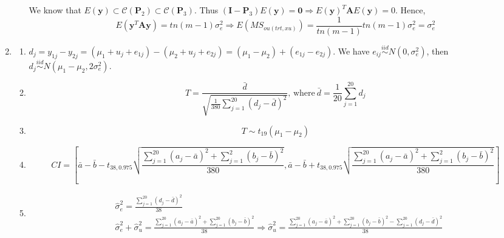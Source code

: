 \documentclass{article}
\begin{document}
\begin{enumerate}[leftmargin = 0 em, label = \arabic*., font = \bfseries]
\begin{enumerate}
	      	 We know that $E(\bm y) \subset \mathcal{C}(\bm P_{2}) \subset \mathcal{C}(\bm P_{3})$. Thus $(\bm I - \bm P_{3}) E(\bm y) = \bm 0 \Rightarrow E(\bm y)^T \bm A E(\bm y) = 0$.
	      	 Hence,
	      	 \[E (\bm y^T \bm A \bm y) = tn(m-1) \sigma_e^2 \Rightarrow E(MS_{ou(trt, xu)}) = \frac{1}{tn(m-1)} tn (m-1) \sigma_e^2 = \sigma_e^2\]
	      	 


			  \end{enumerate}

			  \item 
			  \begin{enumerate}
			  	\item 
			  	$d_j = y_{1j} - y_{2j} = (\mu_1 + u _j + e_{1j}) - (\mu_2 + u_j + e_{2j}) = (\mu_1 - \mu_2) + (e_{1j} - e_{2j})$. We have $e_{ij} \overset{iid}{\sim} N(0, \sigma_{e}^2)$, then $d_j \overset{iid}{\sim} N(\mu_1 - \mu_2 , 2 \sigma_{e}^2)$.

			  	 \item 
			  	 \[T = \frac{\bar{d}}{\sqrt{\frac{1}{380} \sum_{j = 1}^{20} (d_j - \bar{d})^2}},\, \mathrm{where \ } \bar{d} = \frac{1}{20} \sum_{j = 1}^{20} d_j \] 


			  	 \item 
			  	 \[T \sim t_{19}(\mu_1 - \mu_2)\]

			  	 \item 
			  	 \[CI = \left[\bar{a} - \bar{b} - t_{38,0.975 }\sqrt{\frac{\sum_{j=1}^{20} (a_j - \bar{a})^2 + \sum_{j= 1}^2 (b_j - \bar{b})^2}{380}}, \bar{a} - \bar{b} + t_{38,0.975 }\sqrt{\frac{\sum_{j=1}^{20} (a_j - \bar{a})^2 + \sum_{j= 1}^2 (b_j - \bar{b})^2}{380}}\right]\]

			  	 \item 
			  	 \begin{align*}
			  	 & \hat{\sigma}_e^2 = \frac{\sum_{j = 1}^{20} (d_j - \bar{d})^2}{38}\\
			  	 & \hat{\sigma}_e^2 + \hat{\sigma}_u^2 = \frac{\sum_{j=1}^{20} (a_j - \bar{a})^2 + \sum_{j=1}^{20} (b_j - \bar{b})^2}{38} \Rightarrow \hat{\sigma}_u^2 = \frac{\sum_{j=1}^{20} (a_j - \bar{a})^2 + \sum_{j=1}^{20} (b_j - \bar{b})^2 - \sum_{j = 1}^{20} (d_j - \bar{d})^2}{38}
			  	 \end{align*}
			  	 

\end{enumerate}
\end{enumerate}
\end{document}
